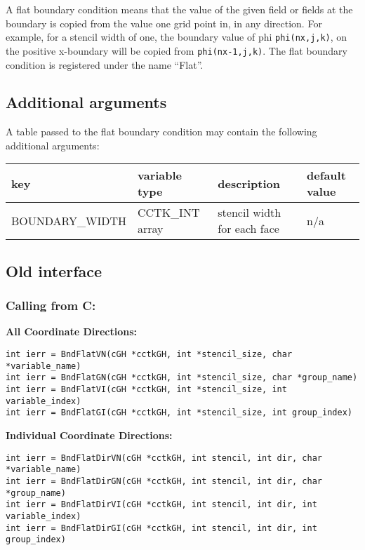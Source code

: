 \documentclass{article}
\begin{document}
A flat boundary condition means that the value of the given 
field or fields at the boundary is copied from the value one grid point in,
in any direction. For example, for a stencil width of one, the
boundary value of phi {\tt phi(nx,j,k)}, on the positive x-boundary will
be copied from {\tt phi(nx-1,j,k)}.  The flat boundary condition is registered under the name ``Flat''.

\subsection{Additional arguments}

A table passed to the flat boundary condition may contain the
following additional arguments:\\[1mm]
\begin{tabular}{|l|l|l|l|}
\hline
\textbf{key} & \textbf{variable type} & \textbf{description} & \textbf{default value}\\
\hline
BOUNDARY\_WIDTH & CCTK\_INT array & stencil width for each face & n/a\\
\hline
\end{tabular}

\subsection{Old interface}

\subsubsection*{Calling from C:}

{\bf All Coordinate Directions:}
\begin{verbatim}
int ierr = BndFlatVN(cGH *cctkGH, int *stencil_size, char *variable_name)
int ierr = BndFlatGN(cGH *cctkGH, int *stencil_size, char *group_name)
int ierr = BndFlatVI(cGH *cctkGH, int *stencil_size, int variable_index)
int ierr = BndFlatGI(cGH *cctkGH, int *stencil_size, int group_index)
\end{verbatim}

\noindent
{\bf Individual Coordinate Directions:}
\begin{verbatim}
int ierr = BndFlatDirVN(cGH *cctkGH, int stencil, int dir, char *variable_name)
int ierr = BndFlatDirGN(cGH *cctkGH, int stencil, int dir, char *group_name)
int ierr = BndFlatDirVI(cGH *cctkGH, int stencil, int dir, int variable_index)
int ierr = BndFlatDirGI(cGH *cctkGH, int stencil, int dir, int group_index)
\end{verbatim}
\end{document}
